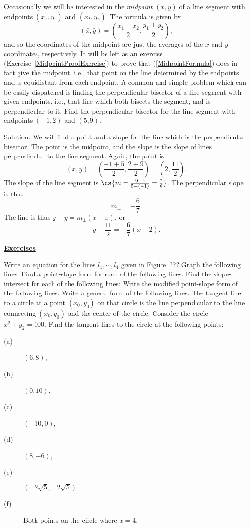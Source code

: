 Occasionally we will be interested in the {\it midpoint} 
$(\bar{x},\bar{y})$
of
a line segment with endpoints $(x_1,y_1)$ and $(x_2,y_2)$.
The formula is given by 
\begin{equation}\label{MidpointFormula}
\left(\bar{x},\bar{y}\right)=\left(\frac{x_1+x_2}2,
\frac{y_1+y_2}2\right),
\end{equation}
and so the coordinates of the midpoint are just the averages
of the $x$ and $y$-coordinates, respectively.
It will be left as an exercise (Exercise~\ref{MidpointProofExercise})
 to prove that 
(\ref{MidpointFormula}) does in fact give the midpoint, i.e.,
that point on the line determined by the endpoints and
is equidistant\footnotemark
{} 
from each endpoint.
A common and simple problem which can be easily dispatched is
finding the {perpendicular bisector} of a line segment
with given endpoints, i.e., that line which both bisects
the segment, and is perpendicular to it.  
\bex
Find the perpendicular bisector for the line segment
with endpoints $(-1,2)$ and $(5,9)$.

\underline{Solution}: We will find a point and a slope for the
line which is the perpendicular bisector.  The point is the
midpoint, and the slope is the slope of lines perpendicular
to the line segment.
Again, the point is
$$(\bar{x},\bar{y})=\left(\frac{-1+5}2,\frac{2+9}2\right)
=\left(2,\frac{11}2\right).$$
The slope of the line segment is $\ds{m=\frac{9-2}{5-(-1)}=\frac76}$.
The perpendicular slope is thus
$$m_\perp=-\frac67.$$
The line is thus $y-\bar{y}=m_\perp(x-\bar{x})$, or
$$y-\frac{11}2=-\frac67(x-2).$$
\eex






\newpage
\begin{center}\underline{\Large{\bf Exercises}}\end{center}
\bigskip

\bhw Write an equation for the lines $l_1,\cdots,l_4$
given in Figure~???
\ehw
\bhw Graph the following lines.
\ehw
\bhw Find a point-slope form for each of the following
lines:
\ehw
\bhw Find the slope-intersect for each of the following
lines:
\ehw
\bhw Write the modified point-slope form of the following
lines.
\ehw
\bhw Write a general form of the following lines:
\ehw
\bhw The tangent line to a circle at a point $(x_0,y_0)$ on
that circle is the line perpendicular to the line
connecting $(x_0,y_0)$ and the center of the circle.
Consider the circle $x^2+y_2=100$.  Find the 
tangent lines to the circle at the following points:
\begin{description}
\item[(a)]$(6,8)$,
\item[(b)]$(0,10)$,
\item[(c)]$(-10,0)$,
\item[(d)]$(8,-6)$,
\item[(e)]$(-2\sqrt5,-2\sqrt5)$
\item[(f)] Both points on the circle where $x=4$.
\end{description}
\ehw

